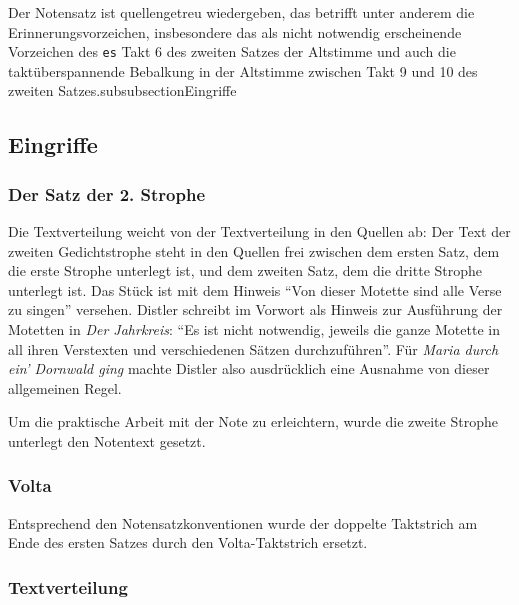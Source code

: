 \documentclass{book}
\begin{document}
\begin{multicols}{2}
Der Notensatz ist quellengetreu wiedergeben, das betrifft unter anderem
die Erinnerungsvorzeichen, insbesondere das als nicht notwendig
erscheinende Vorzeichen des \texttt{es} Takt 6 des zweiten Satzes der
Altstimme und auch die taktüberspannende Bebalkung in der Altstimme
zwischen Takt 9 und 10 des zweiten Satzes.subsubsection{Eingriffe}

\subsection{Eingriffe}

\subsubsection{Der Satz der 2. Strophe}

Die Textverteilung weicht von der Textverteilung in den Quellen ab: Der
Text der zweiten Gedichtstrophe steht in den Quellen frei zwischen dem
ersten Satz, dem die erste Strophe unterlegt ist, und dem zweiten Satz,
dem die dritte Strophe unterlegt ist. Das Stück ist mit dem Hinweis
``Von dieser Motette sind alle Verse zu singen'' versehen. Distler
schreibt im Vorwort als Hinweis zur Ausführung der Motetten in \emph{Der
Jahrkreis}: ``Es ist nicht notwendig, jeweils die ganze Motette in all
ihren Verstexten und verschiedenen Sätzen durchzuführen''. Für
\emph{Maria durch ein' Dornwald ging} machte Distler also ausdrücklich
eine Ausnahme von dieser allgemeinen Regel.

Um die praktische Arbeit mit der Note zu erleichtern, wurde die zweite
Strophe unterlegt den Notentext gesetzt.

\subsubsection{Volta}

Entsprechend den Notensatzkonventionen wurde der doppelte Taktstrich am
Ende des ersten Satzes durch den Volta-Taktstrich ersetzt.

\subsubsection{Textverteilung}


\end{multicols}
\end{document}
